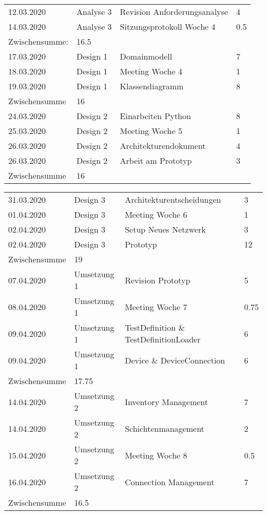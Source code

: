 \documentclass[
	ngerman,
	toc=listof, %
	toc=bibliography, %
	footnotes=multiple, %
	parskip=half, %
	numbers=noendperiod %
]{scrartcl}
\begin{document}
\begin{tabularx}{\textwidth}{llXl}
		12.03.2020 & Analyse 3 & Revision Anforderungsanalyse & 4 \\
		14.03.2020 & Analyse 3 & Sitzungsprotokoll Woche 4 & 0.5 \\
		\midrule
		Zwischensumme: & 16.5 & & \\
		\midrule
		17.03.2020 & Design 1 & Domainmodell & 7 \\
		18.03.2020 & Design 1 & Meeting Woche 4 & 1 \\
		19.03.2020 & Design 1 & Klassendiagramm & 8 \\
		\midrule
		Zwischensumme & 16 & & \\
		\midrule
		24.03.2020 & Design 2 & Einarbeiten Python & 8 \\
		25.03.2020 & Design 2 & Meeting Woche 5 & 1 \\
		26.03.2020 & Design 2 & Architekturendokument & 4 \\
		26.03.2020 & Design 2 & Arbeit am Prototyp & 3 \\
		\midrule
		Zwischensumme & 16 & & \\
		\bottomrule
	\end{tabularx}

	\begin{tabularx}{\textwidth}{llXl}
		\toprule
		31.03.2020 & Design 3 & Architekturentscheidungen & 3 \\
		01.04.2020 & Design 3 & Meeting Woche 6 & 1 \\
		02.04.2020 & Design 3 & Setup Neues Netzwerk & 3 \\
		02.04.2020 & Design 3 & Prototyp & 12 \\
		\midrule
		Zwischensumme & 19 & & \\
		\midrule
		07.04.2020 & Umsetzung 1 & Revision Prototyp & 5 \\
		08.04.2020 & Umsetzung 1 & Meeting Woche 7 & 0.75 \\
		09.04.2020 & Umsetzung 1 & TestDefinition \& TestDefinitionLoader & 6 \\
		09.04.2020 & Umsetzung 1 & Device \& DeviceConnection & 6 \\
		\midrule
		Zwischensumme & 17.75 & & \\
		\midrule
		14.04.2020 & Umsetzung 2 & Inventory Management & 7 \\
		14.04.2020 & Umsetzung 2 & Schichtenmanagement & 2 \\
		15.04.2020 & Umsetzung 2 & Meeting Woche 8 & 0.5 \\
		16.04.2020 & Umsetzung 2 & Connection Management & 7 \\
		\midrule
		Zwischensumme & 16.5 & & \\
		\bottomrule
	\end{tabularx}
\end{document}
